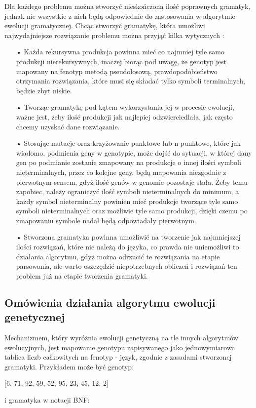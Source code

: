 Dla każdego problemu można stworzyć nieskończoną ilość poprawnych gramatyk, jednak nie wszystkie z nich będą odpowiednie do zastosowania w algorytmie ewolucji gramatycznej. Chcąc stworzyć gramatykę, która umożliwi najwydajniejsze rozwiązanie problemu można przyjąć kilka wytycznych \cite{grammarDesign}: 
\begin{itemize}
  \item[•] Każda rekursywna produkcja powinna mieć co najmniej tyle samo produkcji nierekursywnych, inaczej biorąc pod uwagę, że genotyp jest mapowany na fenotyp metodą pseudolosową, prawdopodobieństwo otrzymania rozwiązania, które musi się składać tylko symboli terminalnych, będzie zbyt niskie.
  \item[•] Tworząc gramatykę pod kątem wykorzystania jej w procesie ewolucji, ważne jest, żeby ilość produkcji jak najlepiej odzwierciedlała, jak często chcemy uzyskać dane rozwiązanie.
  \item[•] Stosując mutacje oraz krzyżowanie punktowe lub n-punktowe, które jak wiadomo, podmienia geny w genotypie, może dojść do sytuacji, w której dany gen po podmianie zostanie zmapowany na produkcje o innej ilości symboli nieterminalnych, przez co kolejne geny, będą mapowania niezgodnie z pierwotnym sensem, gdyż ilość genów w genomie pozostaje stała. Żeby temu zapobiec, należy ograniczyć ilość symboli nieterminalnych do minimum, a każdy symbol nieterminalny powinien mieć produkcje tworzące tyle samo symboli nieterminalnych oraz możliwie tyle samo produkcji, dzięki czemu po zmapowaniu symbole nadal będą odpowiadały pierwotnym. 
  \item[•] Stworzona gramatyka powinna umożliwić na tworzenie jak najmniejszej ilości rozwiązań, które nie należą do języka, co prawda nie uniemożliwi to działania algorytmu, gdyż można odrzucić te rozwiązania na etapie parsowania, ale warto oszczędzić niepotrzebnych obliczeń i rozwiązań ten problem już na etapie tworzenia gramatyki. 
\end{itemize}

\subsection{Omówienia działania algorytmu ewolucji genetycznej}
Mechanizmem, który wyróżnia ewolucji genetyczną na tle innych algorytmów ewolucyjnych, jest mapowanie genotypu zapisywanego jako jednowymiarowa tablica liczb całkowitych na fenotyp - język, zgodnie z zasadami stworzonej gramatyki. Przykładem może być genotyp: 
\begin{center} [6, 71, 92, 59, 52, 95, 23, 45, 12, 2] \end{center}
i gramatyka w notacji BNF:

